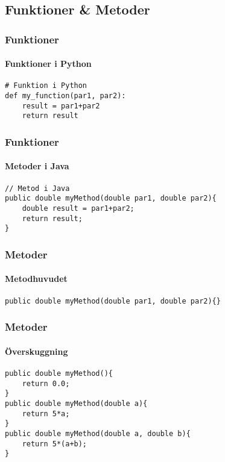 \documentclass[aspectratio=169]{beamer}
\begin{document}
\subsection{Funktioner \& Metoder}

\begin{frame}[fragile]
    \frametitle{Funktioner}
    \framesubtitle{Funktioner i Python}

    \begin{lstlisting}[style=python]
# Funktion i Python
def my_function(par1, par2):
    result = par1+par2
    return result
    \end{lstlisting}

\end{frame}

\begin{frame}[fragile]
    \frametitle{Funktioner}
    \framesubtitle{Metoder i Java}



    \begin{lstlisting}[style=java]
// Metod i Java
public double myMethod(double par1, double par2){
    double result = par1+par2;
    return result;
}
    \end{lstlisting}

\end{frame}

\begin{frame}[fragile]
    \frametitle{Metoder}
    \framesubtitle{Metodhuvudet}

    \begin{lstlisting}[style=java]
public double myMethod(double par1, double par2){}
    \end{lstlisting}


\end{frame}

\begin{frame}[fragile]
    \frametitle{Metoder}
    \framesubtitle{Överskuggning}


    \begin{lstlisting}[style=java]
public double myMethod(){
    return 0.0;
}
public double myMethod(double a){
    return 5*a;
}
public double myMethod(double a, double b){
    return 5*(a+b);
}
    \end{lstlisting}

\end{frame}
\end{document}
